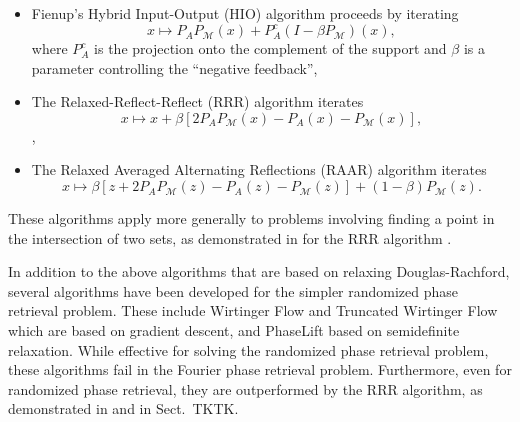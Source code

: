 \documentclass[journal]{IEEEtran}
\theoremstyle{definition}
\theoremstyle{remark}
\theoremstyle{definition}
\theoremstyle{problem}
\theoremstyle{definition}
\newcommand{\MM}{\mathcal{M}}
\newcommand{\TODO}[1]{{\color{red}{[#1]}}}
\begin{document}
\begin{itemize}
    \item Fienup's Hybrid Input-Output (HIO) algorithm proceeds by iterating 
    \begin{equation}\label{eq:HIO}
        x\mapsto P_AP_{\MM}(x) + P_A^c(I-\beta P_{\MM})(x),
    \end{equation} 
    where $P_A^c$ is the projection onto the complement of the support and $\beta$ is a parameter controlling the ``negative feedback'',
    \item The Relaxed-Reflect-Reflect (RRR) algorithm iterates
    \begin{equation}\label{eq:RRR}
        x\mapsto x + \beta\left[2P_AP_{\MM}(x)-P_A(x)-P_{\MM}(x)\right],
    \end{equation},
    \item The Relaxed Averaged Alternating Reflections (RAAR) algorithm iterates
    \begin{equation}\label{eq:RAAR}
        x\mapsto \beta\left[z + 2P_AP_{\MM}(z)-P_A(z)-P_{\MM}(z)\right] + (1-\beta)P_{\MM}(z).
    \end{equation}
\end{itemize}
These algorithms apply more generally to problems involving finding a point in the intersection of two sets, as demonstrated in \TODO{Veit, PNAS} for the RRR algorithm \TODO{Actually, "difference map"}.

In addition to the above algorithms that are based on relaxing Douglas-Rachford, several algorithms have been developed for the simpler randomized phase retrieval problem. These include Wirtinger Flow and Truncated Wirtinger Flow which are based on gradient descent, and PhaseLift based on semidefinite relaxation. While effective for solving the randomized phase retrieval problem, these algorithms fail in the Fourier phase retrieval problem. Furthermore, even for randomized phase retrieval, they are outperformed by the RRR algorithm, as demonstrated in \TODO{benchmarks} and in Sect.~TKTK. 
\end{document}

